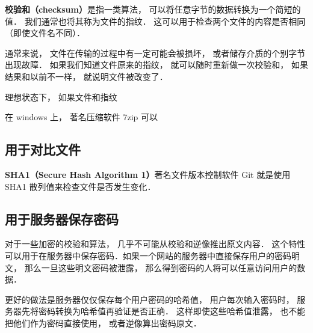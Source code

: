 
\textbf{校验和（checksum）}是指一类算法， 可以将任意字节的数据转换为一个简短的值． 我们通常也将其称为文件的指纹． 这可以用于检查两个文件的内容是否相同（即使文件名不同）． %

通常来说， 文件在传输的过程中有一定可能会被损坏， 或者储存介质的个别字节出现故障． 如果我们知道文件原来的指纹， 就可以随时重新做一次校验和， 如果结果和以前不一样， 就说明文件被改变了．


理想状态下， 如果文件和指纹

在 windows 上， 著名压缩软件 7zip %
可以

\subsection{用于对比文件}
\textbf{SHA1（Secure Hash Algorithm 1）}著名文件版本控制软件 Git %
就是使用 SHA1 散列值来检查文件是否发生变化．

\subsection{用于服务器保存密码}
对于一些加密的校验和算法， 几乎不可能从校验和逆像推出原文内容． 这个特性可以用于在服务器中保存密码．如果一个网站的服务器中直接保存用户的密码明文， 那么一旦这些明文密码被泄露， 那么得到密码的人将可以任意访问用户的数据．

更好的做法是服务器仅仅保存每个用户密码的哈希值， 用户每次输入密码时， 服务器先将密码转换为哈希值再验证是否正确． 这样即使这些哈希值泄露， 也不能把他们作为密码直接使用， 或者逆像算出密码原文．
